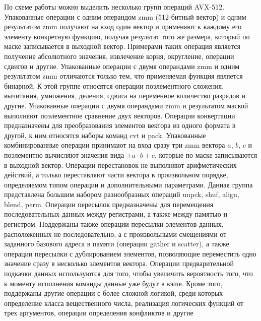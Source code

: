 По схеме работы можно выделить несколько групп операций AVX-512.
Упакованные операции с одним операндом zmm (512-битный вектор) и одним результатом zmm получают на вход один вектор и применяют к каждому его элементу конкретную функцию, получая результат того же размера, который по маске записывается в выходной вектор.
Примерами таких операция является получение абсолютного значения, извлечение корня, округление, операции сдвигов и другие.
Упакованные операции с двумя операндами zmm и одним результатом zmm отличаются только тем, что применяемая функция является бинарной.
К этой группе относятся операции поэлементного сложения, вычитания, умножения, деления, сдвига на переменное количество разрядов и другие.
Упакованные операции с двумя операндами zmm и результатом маской выполняют поэлементное сравнение двух векторов.
Операции конвертации предназначены для преобразования элементов вектора из одного формата в другой, к ним относятся наборы команд cvt и pack.
Упакованные комбинированные операции принимают на вход сразу три zmm вектора $a$, $b$, $c$ и поэлементно вычисляют значения вида $\pm a \cdot b \pm c$, которые по маске записываются в выходной вектор.
Операции перестановок не выполняют арифметических действий, а только переставляют части вектора в произвольном порядке, определяемом типом операции и дополнительными параметрами.
Данная группа представлена большим набором разнообразных операций unpck, shuf, align, blend, perm.
Операции пересылок предназначены для перемещения последовательных данных между регистрами, а также между памятью и регистром.
Поддержаны также операции пересылки элементов данных, расположенных не последовательно, а с произвольными смещениями от заданного базового адреса в памяти (операции gather и scatter), а также операции пересылки с дублированием элементов, позволяющие переместить одно значение сразу в несколько элементов вектора.
Операции предварительной подкачки данных используются для того, чтобы увеличить вероятность того, что к моменту исполнения команды данные уже будут в кэше.
Кроме того, поддержаны другие операции с более сложной логикой, среди которых определение класса вещественного числа, реализация логических функций от трех аргументов, операции определения конфликтов и другие

